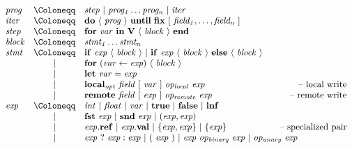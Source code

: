 \documentclass{sokendai_thesis} %
\newcommand{\hsp}[1]{\hspace{-3em}\hbox{#1}}
\begin{document}
\begin{figure}[t]
\normalsize
\[
\begin{array}{lclr}
\mathit{prog}  & \Coloneqq & \mathit{step}~|~\mathit{prog_1}\ldots\mathit{prog_n}~|~\mathit{iter} \\
\mathit{iter} & \Coloneqq & \mathbf{do}~\langle~\mathit{prog}~\rangle~\mathbf{until}~\mathbf{fix}~[~\mathit{field_1},\ldots,\mathit{field_n}~] \\
\mathit{step}& \Coloneqq & \mathbf{for}~\mathit{var}~\mathbf{in}~\mathbf{V}~\langle~\mathit{block}~\rangle~\mathbf{end} \\
\mathit{block} & \Coloneqq & \mathit{stmt_1} \ldots \mathit{stmt_n} \\
\mathit{stmt}  & \Coloneqq & \mathbf{if}~\mathit{exp}~\langle~\mathit{block}~\rangle~|~\mathbf{if}~\mathit{exp}~\langle~\mathit{block}~\rangle~\mathbf{else}~\langle~\mathit{block}~\rangle \\
 & | & \mathbf{for}~(\mathit{var}\leftarrow\mathit{exp})~\langle~\mathit{block}~\rangle \\
 & | & \mathbf{let}~\mathit{var}=\mathit{exp} \\
 & | & \mathbf{local}\mathit{_{opt}}~\mathit{field}~[~\mathit{var}~]~\mathit{op_{local}}~\mathit{exp} & \hsp{-- local write} \\
 & | & \mathbf{remote}~\mathit{field}~[~\mathit{exp}~]~\mathit{op_{remote}}~\mathit{exp} & \hsp{-- remote write} \\
\mathit{exp}   & \Coloneqq & \mathit{int}~|~\mathit{float}~|~\mathit{var}~|~\mathbf{true}~|~\mathbf{false}~|~\mathbf{inf} \\
 & | & \mathbf{fst}~\mathit{exp}~|~\mathbf{snd}~\mathit{exp}~|~(\mathit{exp},\mathit{exp}) \\
 & | & \mathit{exp}.\mathbf{ref}~|~\mathit{exp}.\mathbf{val}~|~\{\mathit{exp},\mathit{exp}\}~|~\{\mathit{exp}\} & \hsp{-- specialized pair} \\
 & | & \mathit{exp}~?~\mathit{exp}:\mathit{exp}~|~(~\mathit{exp}~)~|~\mathit{exp}~\mathit{op_{binary}}~\mathit{exp}~|~\mathit{op_{unary}}~\mathit{exp} \\

\end{array}\]
\end{figure}
\end{document}
